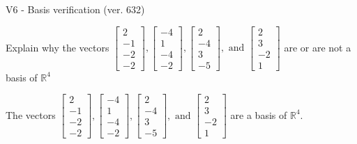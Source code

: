 \begin{exercise}
  \begin{exerciseTitle}V6 - Basis verification (ver. 632)\end{exerciseTitle}
  \begin{exerciseStatement}
    Explain why the vectors \(\left[\begin{array}{r}
2 \\
-1 \\
-2 \\
-2
\end{array}\right] , \left[\begin{array}{r}
-4 \\
1 \\
-4 \\
-2
\end{array}\right] , \left[\begin{array}{r}
2 \\
-4 \\
3 \\
-5
\end{array}\right] , \text{ and } \left[\begin{array}{r}
2 \\
3 \\
-2 \\
1
\end{array}\right]\) are or are not a basis of \(\mathbb{R}^4\)	


  \end{exerciseStatement}
  \begin{exerciseAnswer}
   The vectors \(\left[\begin{array}{r}
2 \\
-1 \\
-2 \\
-2
\end{array}\right] , \left[\begin{array}{r}
-4 \\
1 \\
-4 \\
-2
\end{array}\right] , \left[\begin{array}{r}
2 \\
-4 \\
3 \\
-5
\end{array}\right] , \text{ and } \left[\begin{array}{r}
2 \\
3 \\
-2 \\
1
\end{array}\right]\) 
  	 are  a basis of \(\mathbb{R}^4\).
  


  \end{exerciseAnswer}
\end{exercise}